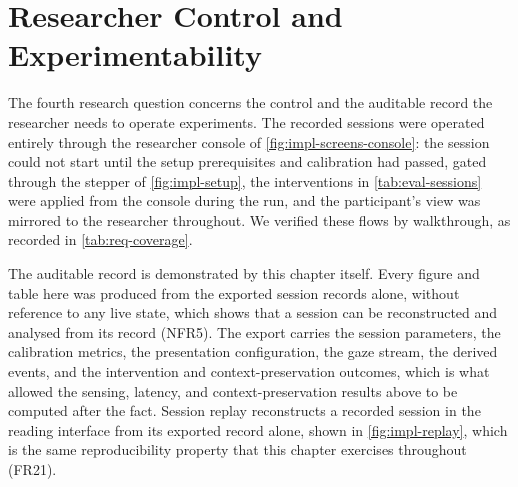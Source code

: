 \section{Researcher Control and Experimentability}
\label{sec:eval-control}

The fourth research question concerns the control and the auditable record the researcher needs to operate experiments.
The recorded sessions were operated entirely through the researcher console of \cref{fig:impl-screens-console}: the session could not start until the setup prerequisites and calibration had passed, gated through the stepper of \cref{fig:impl-setup}, the interventions in \cref{tab:eval-sessions} were applied from the console during the run, and the participant's view was mirrored to the researcher throughout.
We verified these flows by walkthrough, as recorded in \cref{tab:req-coverage}.

The auditable record is demonstrated by this chapter itself.
Every figure and table here was produced from the exported session records alone, without reference to any live state, which shows that a session can be reconstructed and analysed from its record (NFR5).
The export carries the session parameters, the calibration metrics, the presentation configuration, the gaze stream, the derived events, and the intervention and context-preservation outcomes, which is what allowed the sensing, latency, and context-preservation results above to be computed after the fact.
Session replay reconstructs a recorded session in the reading interface from its exported record alone, shown in \cref{fig:impl-replay}, which is the same reproducibility property that this chapter exercises throughout (FR21).
